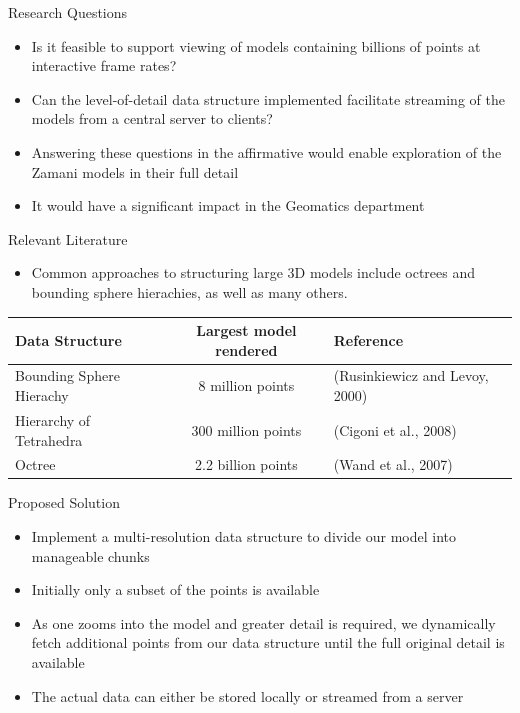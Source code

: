 \documentclass{beamer}
\begin{document}
{\begin{frame}{Research Questions}
\begin{itemize}
\item Is it feasible to support viewing of models containing
  billions of points at interactive frame rates?
\item Can the level-of-detail data structure implemented facilitate streaming of
  the models from a central server to clients?
\item Answering these questions in the affirmative would enable exploration
  of the Zamani models in their full detail
\item It would have a significant impact in the Geomatics department
\end{itemize}
\end{frame}

\begin{frame}{Relevant Literature}

\begin{itemize}
\item Common approaches to structuring large 3D models include octrees and bounding sphere hierachies, as well as many others.
\end{itemize}
{\scriptsize
\begin{tabular}{l|c|l}
 Data Structure & Largest model rendered & Reference \\
\hline
\hline
Bounding Sphere Hierachy  & 8 million points & (Rusinkiewicz and Levoy, 2000) \\
\hline
Hierarchy of Tetrahedra   & 300 million points& (Cigoni et al., 2008)  \\
\hline
Octree          & 2.2 billion points& (Wand et al., 2007)    \\
\end{tabular}}

\end{frame}

\begin{frame}{Proposed Solution}

\begin{itemize}
\item Implement a multi-resolution data structure to divide our model into
  manageable chunks
\item Initially only a subset of the points is available
\item As one zooms into the model and greater detail is required, we dynamically
  fetch additional points from our data structure until the full original
  detail is available
\item The actual data can either be stored locally or streamed from a server
\end{itemize}
\end{frame}


}
\end{document}
